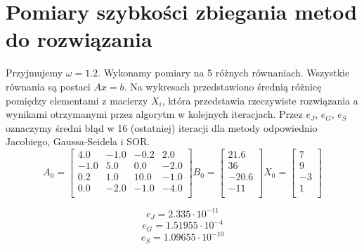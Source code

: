 \documentclass{article}
\begin{document}
\section{Pomiary szybkości zbiegania metod do rozwiązania}
Przyjmujemy $\omega = 1.2$. Wykonamy pomiary na 5 różnych równaniach. Wszystkie równania są postaci $Ax = b$. Na wykresach przedstawiono średnią różnicę pomiędzy elementami z macierzy $X_i$, która przedstawia rzeczywiste rozwiązania a wynikami otrzymanymi przez algorytm w kolejnych iteracjach. Przez $e_J$, $e_G$, $e_S$ oznaczymy średni błąd w 16 (ostatniej) iteracji dla metody odpowiednio Jacobiego, Gaussa-Seidela i SOR.
\[
A_0 =
\begin{bmatrix}
    4.0 & -1.0 & -0.2 & 2.0 \\
    -1.0 & 5.0 & 0.0 & -2.0 \\
    0.2 & 1.0 & 10.0 & -1.0 \\
    0.0 & -2.0 & -1.0 & -4.0 \\
\end{bmatrix}
B_0 = 
\begin{bmatrix}
    21.6 \\
    36 \\
    -20.6 \\
    -11\\
\end{bmatrix}
X_0 = 
\begin{bmatrix}
    7  \\
    9  \\
    -3 \\
    1  \\
\end{bmatrix}
\]
\noindent
{}

\[ e_J = 2.335 \cdot 10^{-11} \]
\[ e_G = 1.51955 \cdot 10^{-4} \]
\[ e_S = 1.09655 \cdot 10^{-10} \]
\end{document}
